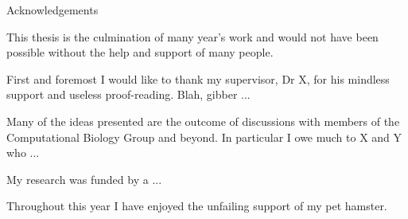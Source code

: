 \vspace*{20mm}
{
\Large\bf
\begin{center}
Acknowledgements
\end{center}
}


This thesis is the culmination of many year's work and would not have
been possible without the help and support of many
people. 

First and foremost I would like to thank my supervisor,
Dr X, for his mindless support and useless proof-reading.
Blah, gibber ...

Many of the ideas presented are the outcome of discussions
with members of the Computational Biology Group and beyond. In particular I owe
much to X and Y who ...

My research was funded by a ...

Throughout this year I have enjoyed the unfailing support of
my pet hamster.
